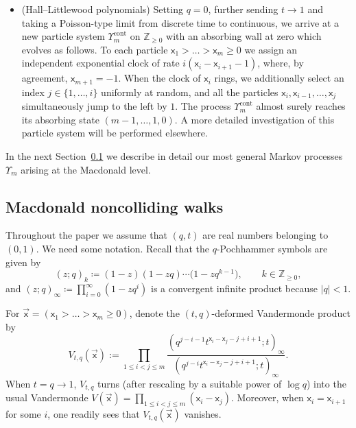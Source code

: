 \documentclass[pdftex]{sigma}
\numberwithin{equation}{section}
\begin{document}
\begin{itemize}
	\item (Hall--Littlewood polynomials)
		Setting
		$q=0$, further sending $t\to1$ and taking a Poisson-type limit from
		discrete time to continuous,
		we arrive at a new particle system
		$\Upsilon_m^{\mathrm{cont}}$
		on $\mathbb{Z}_{\ge0}$
		with an absorbing wall at zero which evolves as follows.
		To each particle $\mathsf{x}_1>\dots>\mathsf{x}_m\ge0 $
		we assign an independent exponential clock
		of rate $i(\mathsf{x}_i-\mathsf{x}_{i+1}-1)$,
		where, by agreement, $\mathsf{x}_{m+1}=-1$.
		When the clock of $\mathsf{x}_{i}$ rings,
		we additionally
		select an index $j \in \{ 1,\dots,i \}$
		uniformly at random,
		and all the particles
		$\mathsf{x}_i,\mathsf{x}_{i-1},\dots,\mathsf{x}_j $
		simultaneously
		jump to the left by $1$.
		The process $\Upsilon_m^{\mathrm{cont}}$
		almost surely reaches its absorbing state
		$(m-1,\dots,1,0)$.
		A more detailed investigation of this particle system will be
		performed elsewhere.
\end{itemize}

In the next
Section~\ref{sub:intro_details}
we describe in detail our most general Markov processes
$\Upsilon_m$ arising at the Macdonald level.

\subsection{Macdonald noncolliding walks}\label{sub:intro_details}

Throughout the paper we assume that
$(q,t)$ are real numbers belonging to $(0,1)$.
We need some notation.
Recall that the $q$-Pochhammer symbols are given by
\begin{equation*}
	(z;q)_k\coloneqq (1-z)(1-zq)\cdots\big(1-zq^{k-1}\big),
	\qquad
	k\in \mathbb{Z}_{\ge0},
\end{equation*}
and $(z;q)_\infty\coloneqq\prod_{i=0}^{\infty}(1-zq^i)$ is a convergent infinite
product because $|q|<1$.

For $\vec{\mathsf{x}}=(\mathsf{x}_1>\dots>\mathsf{x}_m\ge0 )$,
denote the $(t,q)$-deformed Vandermonde product by
\begin{equation}
	\label{eq:V_tq}
	V_{t,q}(\vec{\mathsf{x}}):=
	\prod_{1\le i<j\le m}
	\frac{\left( q^{j-i-1}t^{\mathsf{x}_i-\mathsf{x}_j-j+i+1};t \right)_{\infty}}
	{(q^{j-i} t^{\mathsf{x}_i-\mathsf{x}_j-j+i+1};t)_{\infty}}.
\end{equation}
When $t=q\to 1$, $V_{t,q}$ turns (after rescaling by a suitable power of $\log q$)
into the
usual Vandermonde
$V(\vec{\mathsf{x}})=\prod_{1\le i<j \le m}(\mathsf{x}_i-
\mathsf{x}_j)$. Moreover,
when $\mathsf{x}_i=\mathsf{x}_{i+1}$ for some $i$,
one readily sees that $V_{t,q}(\vec{\mathsf{x}})$
vanishes.
\end{document}

